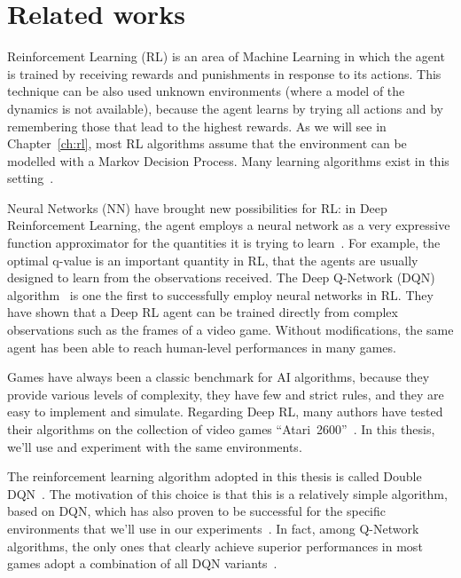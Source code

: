 \section{Related works}

\label{sec:intro-related}

Reinforcement Learning (RL) is an area of Machine Learning in which the agent
is trained by receiving rewards and punishments in response to its actions.
This technique can be also used unknown environments (where a model of the
dynamics is not available), because the agent learns by trying all actions and
by remembering those that lead to the highest rewards. As we will see in
Chapter~\ref{ch:rl}, most RL algorithms assume that the environment can be
modelled with a Markov Decision Process. Many learning algorithms exist in
this setting~\cite{bib:rl-book}.

Neural Networks (NN) have brought new possibilities for RL: in Deep
Reinforcement Learning, the agent employs a neural network as a very
expressive function approximator for the quantities it is trying to
learn~\cite{bib:deep-rl}. For example, the optimal q-value is an important
quantity in RL, that the agents are usually designed to learn from the
observations received. The Deep Q-Network (DQN)
algorithm~\cite{bib:atari-deeprl} is one the first to successfully employ
neural networks in RL. They have shown that a Deep RL agent can be trained
directly from complex observations such as the frames of a video game. Without
modifications, the same agent has been able to reach human-level performances
in many games.

Games have always been a classic benchmark for AI algorithms, because they
provide various levels of complexity, they have few and strict rules, and they
are easy to implement and simulate. Regarding Deep RL, many authors have
tested their algorithms on the collection of video games
``Atari~2600''~\cite{bib:atari-games}. In this thesis, we'll use and
experiment with the same environments.

The reinforcement learning algorithm adopted in this thesis is called Double
DQN~\cite{bib:double-q}. The motivation of this choice is that this is a
relatively simple algorithm, based on DQN, which has also proven to be
successful for the specific environments that we'll use in our
experiments~\cite{bib:atari-deepq-nature}.  In fact, among Q-Network
algorithms, the only ones that clearly achieve superior performances in most
games adopt a combination of all DQN variants~\cite{bib:rainbow}.

